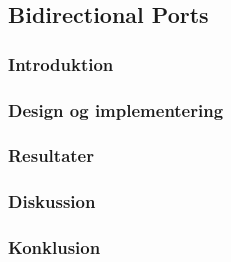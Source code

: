 \subsection{Bidirectional Ports}

\subsubsection{Introduktion}

\subsubsection{Design og implementering}

\subsubsection{Resultater}

\subsubsection{Diskussion}

\subsubsection{Konklusion}